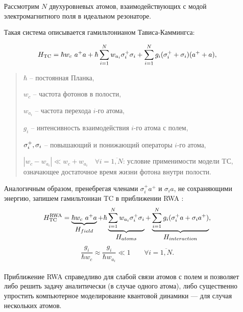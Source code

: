 Рассмотрим $N$ двухуровневых атомов, взаимодействующих с модой электромагнитного поля в идеальном резонаторе. 

Такая система описывается гамильтонианом Тависа-Каммингса:
\begin{normalsize}
	\begin{equation}
		H_{\text{TC}} =  \hbar w_{c}\ a^{+}a + \hbar \sum_{i=1}^N{w_{a_{i}}\sigma_{i}^{+}\sigma_{i}} + \sum_{i=1}^N{g_{i}(\sigma_{i}^{+}+\sigma_{i})(a^{+}+a)},
	\end{equation}
\end{normalsize}

\begin{quote}
	$\hbar $ -- постоянная Планка,
	
	$w_{c}$ -- частота фотонов в полости,
	
	$w_{a_{i}}$ -- частота перехода $i$-го атома,
	
	$g_{i}$ -- интенсивность взаимодействия $i$-го атома с полем,
	
	$\sigma_{i}^{+}, \sigma_{i}$ -- повышающий и понижающий операторы $i$-го атома,
	
	$|w_{c}-w_{a_{i}}|\ll w_{c}+w_{a_{i}} \quad\forall i = \overline{1,N}$: условие применимости модели TС, означающее достаточное время жизни фотона внутри полости.
\end{quote}

\indent Аналогичным образом, пренебрегая членами $\displaystyle{\sigma_{i}^{+}a^{+}}$ и $\displaystyle{\sigma_{i} a}$, не сохраняющими энергию, запишем гамильтониан TC в приближении RWA \cite{rwa_rabi_1,rwa_rabi_2,ozhigov_qq}:
\begin{equation}
	H_{\text{TC}}^{\text{RWA}} = \underbrace{\hbar w_{c}\ a^{+}a}_{\textstyle H_{field}} + \hbar\underbrace{\sum_{i=1}^N{w_{a_{i}}\sigma_{i}^+\sigma_{i}}}_{\textstyle H_{atoms}} + \underbrace{\sum_{i=1}^N{g_{i}(\sigma_{i}^{+}a+\sigma_{i}a^{+})}}_{\textstyle H_{interaction}},
\end{equation}
\begin{equation}
	\frac{g_{i}}{\hbar w_{c}}\approx\frac{g_{i}}{\hbar w_{a_{i}}}\ll1 \qquad \forall i = \overline{1,N}.
\end{equation}
\vspace{-1em}
\
\\[0pt]
\indent Приближение RWA \cite{rwa_rabi_1,rwa_rabi_2,ozhigov_qq} справедливо для слабой связи атомов с полем и позволяет либо решить задачу аналитически (в случае одного атома), либо существенно упростить компьютерное моделирование квантовой динамики --- для случая нескольких атомов. 


